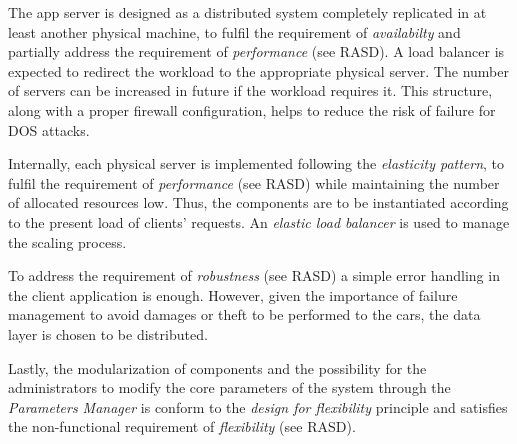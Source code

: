 	The app server is designed as a distributed system completely replicated in at least another physical machine, to fulfil the requirement of \textit{availabilty} and partially address the requirement of \textit{performance} (see RASD). A load balancer is expected to redirect the workload to the appropriate physical server. The number of servers can be increased in future if the workload requires it. This structure, along with a proper firewall configuration, helps to reduce the risk of failure for DOS attacks.

	Internally, each physical server is implemented following the \textit{elasticity pattern}, to fulfil the requirement of \textit{performance} (see RASD) while maintaining the number of allocated resources low. Thus, the components are to be instantiated according to the present load of clients' requests. An \textit{elastic load balancer} is used to manage the scaling process.

	To address the requirement of \textit{robustness} (see RASD) a simple error handling in the client application is enough. However, given the importance of failure management to avoid damages or theft to be performed to the cars, the data layer is chosen to be distributed.

	Lastly, the modularization of components and the possibility for the administrators to modify the core parameters of the system through the \textit{Parameters Manager} is conform to the \textit{design for flexibility} principle and satisfies the non-functional requirement of \textit{flexibility} (see RASD).
\FloatBarrier

